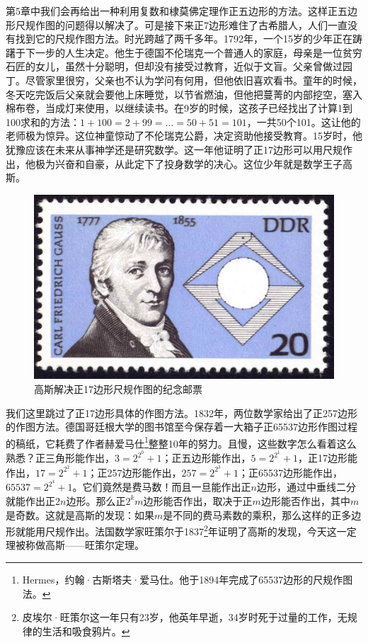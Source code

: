 \documentclass[b5paper]{ctexart}
\begin{document}
第5章中我们会再给出一种利用复数和棣莫佛定理作正五边形的方法。这样正五边形尺规作图的问题得以解决了。可是接下来正7边形难住了古希腊人，人们一直没有找到它的尺规作图方法。时光跨越了两千多年。1792年，一个15岁的少年正在踌躇于下一步的人生决定。他生于德国不伦瑞克一个普通人的家庭，母亲是一位贫穷石匠的女儿，虽然十分聪明，但却没有接受过教育，近似于文盲。父亲曾做过园丁。尽管家里很穷，父亲也不认为学问有何用，但他依旧喜欢看书。童年的时候，冬天吃完饭后父亲就会要他上床睡觉，以节省燃油，但他把蔓菁的内部挖空，塞入棉布卷，当成灯来使用，以继续读书。在9岁的时候，这孩子已经找出了计算1到100求和的方法：$1 + 100 = 2 + 99 = \dotso = 50 + 51 = 101$，一共50个101。这让他的老师极为惊异。这位神童惊动了不伦瑞克公爵，决定资助他接受教育。15岁时，他犹豫应该在未来从事神学还是研究数学。这一年他证明了正17边形可以用尺规作出\cite{Gauss-Britannia-2025}，他极为兴奋和自豪，从此定下了投身数学的决心。这位少年就是数学王子高斯。

\begin{figure}[htbp]
 \centering
 \includegraphics[scale=0.5]{img/gauss-17gon}
 \caption{高斯解决正17边形尺规作图的纪念邮票}
 \label{fig:gauss-17gon}
\end{figure}

我们这里跳过了正17边形具体的作图方法。1832年，两位数学家给出了正257边形的作图方法。德国哥廷根大学的图书馆至今保存着一大箱子正65537边形作图过程的稿纸，它耗费了作者赫爱马仕\footnote{Hermes，约翰·古斯塔夫·爱马仕。他于1894年完成了65537边形的尺规作图法。}整整10年的努力。且慢，这些数字怎么看着这么熟悉？正三角形能作出，$3 = 2^{2^0} + 1$；正五边形能作出，$5 = 2^{2^1} + 1$，正17边形能作出，$17 = 2^{2^2} + 1$；正257边形能作出，$257 = 2^{2^3} + 1$；正65537边形能作出，$65537 = 2^{2^4} + 1$。它们竟然是费马数！而且一旦能作出正$n$边形，通过中垂线二分就能作出正$2n$边形。那么正$2^k m$边形能否作出，取决于正$m$边形能否作出，其中$m$是奇数。这就是高斯的发现：如果$m$是不同的费马素数的乘积，那么这样的正多边形就能用尺规作出。法国数学家旺策尔于1837\footnote{皮埃尔·旺策尔这一年只有23岁，他英年早逝，34岁时死于过量的工作，无规律的生活和吸食鸦片。}年证明了高斯的发现，今天这一定理被称做高斯——旺策尔定理。
\end{document}
